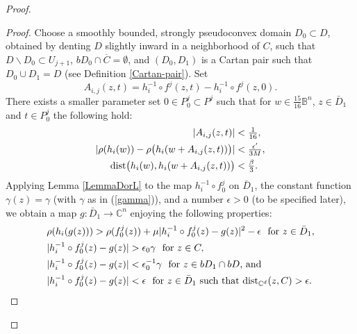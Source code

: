 \documentclass[11pt]{amsart}
\numberwithin{equation}{section}
\theoremstyle{definition}
\begin{document}
\begin{proof}
\begin{proof}
Choose a smoothly bounded, strongly pseudoconvex domain $D_0\subset D$, 
obtained by denting $D$ slightly inward in a neighborhood of $C$, such that
$D{\backslash} D_0\subset U_{j+1}$, $bD_0\cap \overline C=\emptyset$, and 
$(D_0,D_1)$ is a Cartan pair such that $D_0\cup D_1=D$ 
(see Definition \ref{Cartan-pair}). Set
\[
		A_{i,j}(z,t)= h_i^{-1}\circ f^j(z,t) - h_i^{-1}\circ f^j(z,0).
\]
There exists a smaller parameter set $0\in P^j_0\subset P^j$ such that for 
$w\in \tfrac{15}{16}{\mathbb{B}}^n$, $z\in \bar D_1$ and $t\in P^j_0$ the following hold:
\begin{align}
	|A_{i,j}(z,t)| &< \tfrac1{16}, 
\label{defPl1}\\
	|\rho(h_i(w))- \rho\bigl( h_i(w+ A_{i,j}(z,t)) \bigr)| &< \tfrac{{\epsilon}'}{3M},
\label{defPl2}\\
	{\rm dist}\bigl( h_i(w), h_i(w+A_{i,j}(z,t))\bigr) &< \tfrac\beta {3}.
\label{defPl3}
\end{align}
Applying Lemma \ref{LemmaDorL} to the map 
$h_i^{-1}\circ f_0^j$ on $\bar D_1$, the constant function $\gamma(z)=\gamma$
(with $\gamma$ as in (\ref{gamma})), 
and a number ${\epsilon}>0$ (to be specified later), we obtain a map 
$g\colon\bar D_1 \to {\mathbb{C}}^n$ enjoying the following properties:
\begin{align}
	& \rho(h_i(g(z))) > \rho(f_0^j(z))+ \mu|h_i^{-1}\circ f_0^j(z) -g(z)|^2-\epsilon 
	\ \text{ for }z\in\bar D_1, 
\label{lastng1} \\
	& |h_i^{-1}\circ f_0^j(z)-g(z)| > \epsilon_0\gamma  \ \text{ for }z\in C,
\label{lastng2}\\
	& |h_i^{-1}\circ f_0^j(z) -g(z)| < \epsilon_0^{-1}\gamma 
				\ \text{ for }z\in bD_1\cap bD \text{, and}\label{lastng4}\\
	& |h_i^{-1}\circ f_0^j(z) -g(z)| < \epsilon \ \text{ for }z\in \bar D_1
	\text{ such that }{\rm dist}_{{\mathbb{C}}^d}(z,C)>\epsilon.
\label{lastng3}
\end{align}


\end{proof}
\end{proof}
\end{document}
